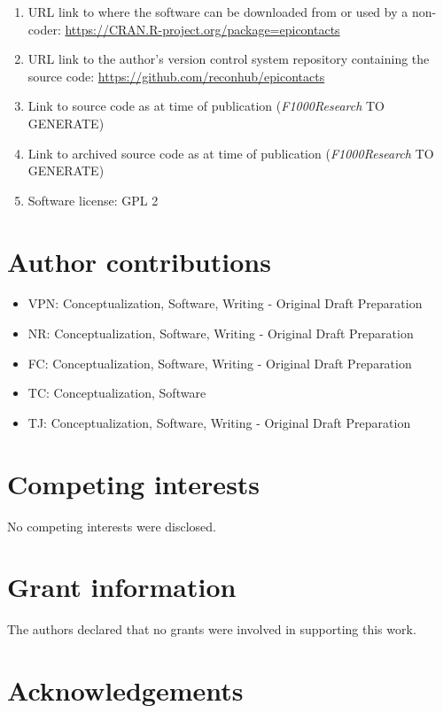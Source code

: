 \documentclass[9pt,a4paper,]{extarticle}
\theoremstyle{definition}
\theoremstyle{definition}
\theoremstyle{definition}
\theoremstyle{remark}
\begin{document}
\begin{enumerate}
\def\labelenumi{\arabic{enumi}.}
\item
  URL link to where the software can be downloaded from or used by a non-coder: \url{https://CRAN.R-project.org/package=epicontacts}
\item
  URL link to the author's version control system repository containing the source code: \url{https://github.com/reconhub/epicontacts}
\item
  Link to source code as at time of publication (\emph{F1000Research} TO GENERATE)
\item
  Link to archived source code as at time of publication (\emph{F1000Research} TO GENERATE)
\item
  Software license: GPL 2
\end{enumerate}

\section{Author contributions}\label{author-contributions}

\begin{itemize}
\item
  VPN: Conceptualization, Software, Writing - Original Draft Preparation
\item
  NR: Conceptualization, Software, Writing - Original Draft Preparation
\item
  FC: Conceptualization, Software, Writing - Original Draft Preparation
\item
  TC: Conceptualization, Software
\item
  TJ: Conceptualization, Software, Writing - Original Draft Preparation
\end{itemize}

\section{Competing interests}\label{competing-interests}

No competing interests were disclosed.

\section{Grant information}\label{grant-information}

The authors declared that no grants were involved in supporting this work.

\section{Acknowledgements}\label{acknowledgements}
\end{document}
